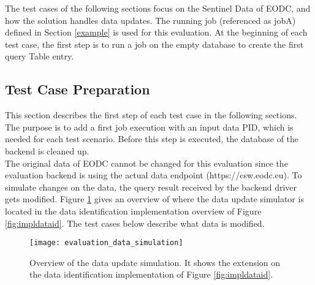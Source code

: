 \documentclass[draft,final]{vutinfth} %
\begin{document}
The test cases of the following sections focus on the Sentinel Data of EODC, and how the solution handles data updates. The running job (referenced as jobA) defined in Section \ref{example} is used for this evaluation. At the beginning of each test case, the first step is to run a job on the empty database to create the first query Table entry. 

\subsection{Test Case Preparation}
This section describes the first step of each test case in the following sections. The purpose is to add a first job execution with an input data PID, which is needed for each test scenario. Before this step is executed, the database of the backend is cleaned up.\\ The original data of EODC cannot be changed for this evaluation since the evaluation backend is using the actual data endpoint (https://csw.eodc.eu). To simulate changes on the data, the query result received by the backend driver gets modified. Figure \ref{fig:eva_data_simulation} gives an overview of where the data update simulator is located in the data identification implementation overview of Figure \ref{fig:impldataid}. The test cases below describe what data is modified. \\

\begin{figure}[h]
	\centering
	\texttt{[image: evaluation\_data\_simulation]}
	\caption{Overview of the data update simulation. It shows the extension on the data identification implementation of Figure \ref{fig:impldataid}.}
	\label{fig:eva_data_simulation} %
\end{figure}
\end{document}
